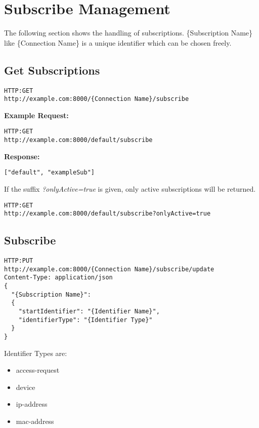 \section{Subscribe Management}
The following section shows the handling of subscriptions. \{Subscription Name\} like \{Connection Name\} is a unique identifier which can be chosen freely.
\subsection{Get Subscriptions}
\begin{lstlisting}
HTTP:GET
http://example.com:8000/{Connection Name}/subscribe
\end{lstlisting}

\begin{minipage}{\linewidth}
\textbf{Example Request:}
\begin{lstlisting}
HTTP:GET
http://example.com:8000/default/subscribe
\end{lstlisting}
\end{minipage}

\begin{minipage}{\linewidth}
\textbf{Response:}
\begin{lstlisting}
["default", "exampleSub"]
\end{lstlisting}
\end{minipage}

If the suffix \textit{?onlyActive=true} is given, only active subscriptions will be returned.

\begin{lstlisting}
HTTP:GET
http://example.com:8000/default/subscribe?onlyActive=true
\end{lstlisting}


\subsection{Subscribe}
\begin{lstlisting}
HTTP:PUT
http://example.com:8000/{Connection Name}/subscribe/update
Content-Type: application/json
{
  "{Subscription Name}":
  {
    "startIdentifier": "{Identifier Name}",
    "identifierType": "{Identifier Type}"
  }
}
\end{lstlisting}
Identifier Types are:
\begin{itemize}
\item access-request
\item device
\item ip-address
\item mac-address
\end{itemize}

